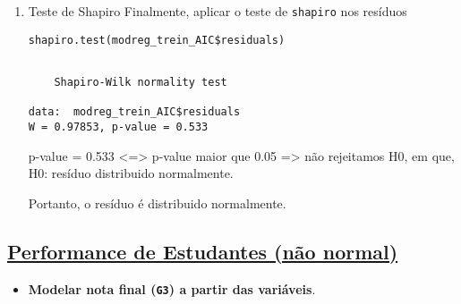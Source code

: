 \documentclass[11pt]{article}
\begin{document}
\begin{enumerate}
\item Teste de Shapiro
\label{sec:org29d4b48}
Finalmente, aplicar o teste de \texttt{shapiro} nos resíduos

\begin{verbatim}
shapiro.test(modreg_trein_AIC$residuals)
\end{verbatim}

\begin{verbatim}

	Shapiro-Wilk normality test

data:  modreg_trein_AIC$residuals
W = 0.97853, p-value = 0.533
\end{verbatim}


p-value = 0.533 <=> p-value maior que 0.05 => não rejeitamos H0, em que, H0: resíduo distribuido normalmente.

Portanto, o resíduo é distribuido normalmente.
\end{enumerate}

\subsection{\href{https://archive.ics.uci.edu/ml/datasets/Student+Performance\#}{Performance de Estudantes (não normal)}}
\label{sec:orga118e79}
\begin{itemize}
\item \textbf{Modelar nota final (\texttt{G3}) a partir das variáveis}.
\end{itemize}
\end{document}
